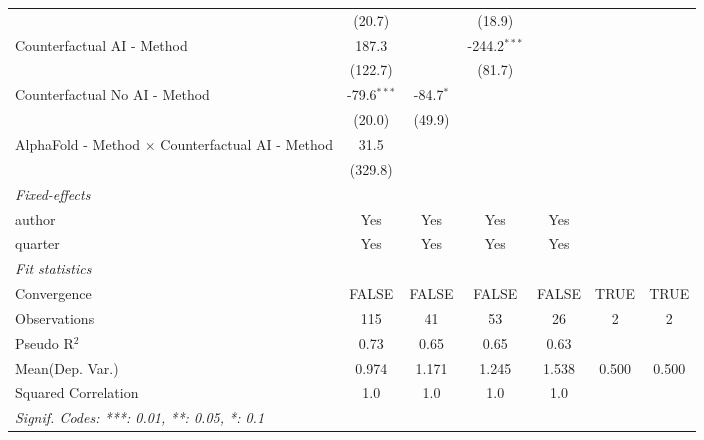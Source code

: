 \begin{tabular}{lcccccc}
                                                           & (20.7)        &              & (18.9)         &               &      &   \\   
   Counterfactual AI - Method                              & 187.3         &              & -244.2$^{***}$ &               &      &   \\   
                                                           & (122.7)       &              & (81.7)         &               &      &   \\   
   Counterfactual No AI - Method                           & -79.6$^{***}$ & -84.7$^{*}$  &                &               &      &   \\   
                                                           & (20.0)        & (49.9)       &                &               &      &   \\   
   AlphaFold - Method $\times$ Counterfactual AI - Method  & 31.5          &              &                &               &      &   \\   
                                                           & (329.8)       &              &                &               &      &   \\   
   \midrule
   \emph{Fixed-effects}\\
   author                                                  & Yes           & Yes          & Yes            & Yes           &      & \\  
   quarter                                                 & Yes           & Yes          & Yes            & Yes           &      & \\  
   \midrule
   \emph{Fit statistics}\\
   Convergence                                             &FALSE          & FALSE        & FALSE          & FALSE         & TRUE & TRUE\\  
   Observations                                            & 115           & 41           & 53             & 26            & 2    & 2\\  
   Pseudo R$^2$                                            & 0.73          & 0.65         & 0.65           & 0.63          &      & \\  
Mean(Dep. Var.) & 0.974 & 1.171 & 1.245 & 1.538 & 0.500 & 0.500 \\
   Squared Correlation                                     & 1.0           & 1.0          & 1.0            & 1.0           &      & \\  
   \midrule \midrule
   \multicolumn{7}{l}{\emph{Signif. Codes: ***: 0.01, **: 0.05, *: 0.1}}\\
\end{tabular}
\par\endgroup
